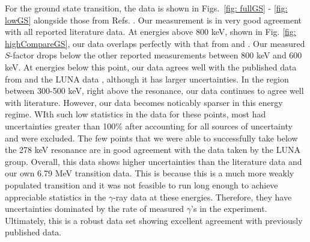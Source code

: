For the ground state transition, the data is shown in Figs.~\ref{fig: fullGS} - \ref{fig: lowGS} alongside those from Refs. \cite{Schroder1987, Formicola2004, Imbriani2005, Runkle2005, Marta2008, Marta2011, Li2016, Wagner2018}. Our measurement is in very good agreement with all reported literature data. At energies above 800 keV, shown in Fig. \ref{fig: highCompareGS}, our data overlaps perfectly with that from \citet{Schroder1987} and \citet{Li2016}. Our measured $S$-factor drops below the other reported measurements between 800 keV and 600 keV. At energies below this point, our data agrees well with the published data from \citet{Runkle2005} and the LUNA data \cite{Formicola2004, Imbriani2005, Marta2008, Marta2011}, although it has larger uncertainties. In the region between 300-500 keV, right above the resonance, our data continues to agree well with literature. However, our data becomes noticably sparser in this energy regime. WIth such low statistics in the data for these points, most had uncertainties greater than 100\% after accounting for all sources of uncertainty and were excluded. The few points that we were able to successfully take below the 278 keV resonance are in good agreement with the data taken by the LUNA group. Overall, this data shows higher uncertainties than the literature data and our own  6.79 MeV transition data. This is because this is a much more weakly populated transition and it was not feasible to run long enough to achieve appreciable statistics in the $\gamma$-ray data at these energies. Therefore, they have uncertainties dominated by the rate of measured $\gamma$'s in the experiment. Ultimately, this is a robust data set showing excellent agreement with previously published data.





